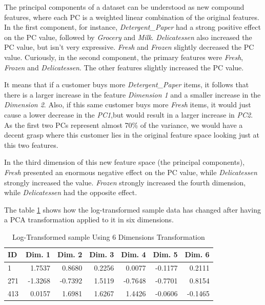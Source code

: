 \documentclass[a4paper]{article}
\begin{document}
The principal components of a dataset can be understood as new compound features, where each PC is a weighted linear combination of the original features. In the first component, for instance, \textit{Detergent\_Paper} had a strong positive effect on the PC value, followed by \textit{Grocery} and \textit{Milk}. \textit{Delicatessen} also increased the PC value, but isn't very expressive. \textit{Fresh} and \textit{Frozen} slightly decreased the PC value. Curiously, in the second component, the primary features were \textit{Fresh}, \textit{Frozen} and \textit{Delicatessen}. The other features slightly increased the PC value.

It means that if a customer buys more \textit{Detergent\_Paper} items, it follows that there is a larger increase in the feature \textit{Dimension 1} and a smaller increase in the \textit{Dimension 2}. Also, if this same customer buys more \textit{Fresh} items, it would just cause a lower decrease in the \textit{PC1},but would result in a larger increase in \textit{PC2}. As the first two PCs represent almost 70\% of the variance, we would have a decent grasp where this customer lies in the original feature space looking just at this two features.

In the third dimension of this new feature space (the principal components), \textit{Fresh} presented an enormous negative effect on the PC value, while \textit{Delicatessen} strongly increased the value. \textit{Frozen} strongly increased the fourth dimension, while \textit{Delicatessen} had the opposite effect.

The table \ref{tab:sample_transformed_1} shows how the log-transformed sample data has changed after having a PCA transformation applied to it in six dimensions.

\begin{table}[ht!]
\centering
\begin{tabular}{l|rrrrrr}
{ID} &  Dim. 1 &  Dim. 2 &  Dim. 3 &  Dim. 4 &  Dim. 5 &  Dim. 6 \\\hline
1   &       1.7537 &       0.8680 &       0.2256 &       0.0077 &      -0.1177 &       0.2111 \\
271 &      -1.3268 &      -0.7392 &       1.5119 &      -0.7648 &      -0.7701 &       0.8154 \\
413 &       0.0157 &       1.6981 &       1.6267 &       1.4426 &      -0.0606 &      -0.1465 \\

\end{tabular}
\caption{\label{tab:sample_transformed_1}Log-Transformed sample Using 6 Dimensions Transformation}
\end{table}
\end{document}
